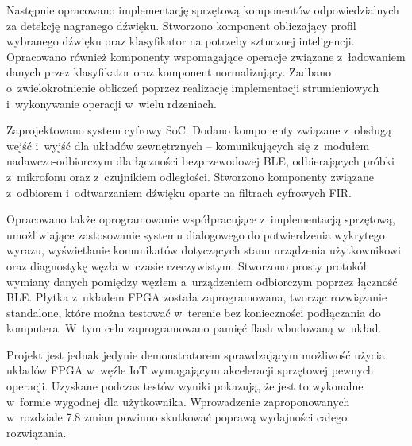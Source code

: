 \documentclass[
    left=2.5cm,         %
    right=2.5cm,        %
    top=2.5cm,          %
    bottom=3cm,         %
    bindingoffset=6mm,  %
    nohyphenation=true %
]{eiti/eiti-thesis} %
\begin{document}
Następnie opracowano implementację sprzętową komponentów odpowiedzialnych za detekcję nagranego dźwięku. Stworzono komponent obliczający profil wybranego dźwięku oraz klasyfikator na potrzeby sztucznej inteligencji. Opracowano również komponenty wspomagające operacje związane z~ładowaniem danych przez klasyfikator oraz komponent normalizujący. Zadbano o~zwielokrotnienie obliczeń poprzez realizację implementacji strumieniowych i~wykonywanie operacji w~wielu rdzeniach.

Zaprojektowano system cyfrowy SoC. Dodano komponenty związane z~obsługą wejść i~wyjść dla układów zewnętrznych – komunikujących się z~modułem nadawczo-odbiorczym dla łączności bezprzewodowej BLE, odbierających próbki z~mikrofonu oraz z~czujnikiem odległości. Stworzono komponenty związane z~odbiorem i~odtwarzaniem dźwięku oparte na filtrach cyfrowych FIR.

Opracowano także oprogramowanie współpracujące z~implementacją sprzętową, umożliwiające zastosowanie systemu dialogowego do potwierdzenia wykrytego wyrazu, wyświetlanie komunikatów dotyczących stanu urządzenia użytkownikowi oraz diagnostykę węzła w~czasie rzeczywistym. Stworzono prosty protokół wymiany danych pomiędzy węzłem a~urządzeniem odbiorczym poprzez łączność BLE. Płytka z~układem FPGA została zaprogramowana, tworząc rozwiązanie standalone, które można testować w~terenie bez konieczności podłączania do komputera. W~tym celu zaprogramowano pamięć flash wbudowaną w~układ.

Projekt jest jednak jedynie demonstratorem sprawdzającym możliwość użycia układów FPGA w~węźle IoT wymagającym akceleracji sprzętowej pewnych operacji. Uzyskane podczas testów wyniki pokazują, że jest to wykonalne w~formie wygodnej dla użytkownika. Wprowadzenie zaproponowanych w~rozdziale 7.8 zmian powinno skutkować poprawą wydajności całego rozwiązania.
\newpage

\printbibliography

\acronymlist
{}


\vspace{0.8cm}
\end{document}
